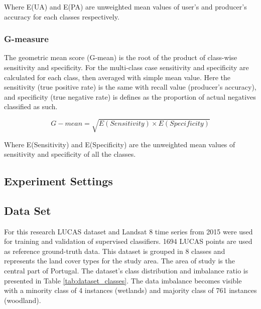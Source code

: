 \documentclass[parskip=full]{scrartcl}
\begin{document}
Where E(UA) and E(PA) are unweighted mean values of user's and producer's
accuracy for each classes respectively.

\subsubsection{G-measure}

The geometric mean score (G-mean) is the root of the product of class-wise
sensitivity and specificity. For the multi-class case sensitivity and
specificity are calculated for each class, then averaged with simple mean
value. Here the sensitivity (true positive rate) is the same with recall
value (producer's accuracy), and specificity (true negative rate) is defines as
the proportion of actual negatives classified as such.

\[
G{-}mean = \sqrt{E(Sensitivity) \times E(Specificity)}
\]

Where E(Sensitivity) and E(Specificity) are the unweighted mean values of
sensitivity and specificity of all the classes.

\subsection{Experiment Settings}

\subsection{Data Set}

For this research LUCAS dataset and Landsat 8 time series from 2015 were used
for training and validation of supervised classifiers. 1694 LUCAS points are
used as reference ground-truth data. This dataset is grouped in 8 classes and
represents the land cover types for the study area. The area of study is the
central part of Portugal. The dataset's class distribution and imbalance ratio
is presented in Table \ref{tab:dataset_classes}. The data imbalance becomes
visible with a minority class of 4 instances (wetlands) and majority class of
761 instances (woodland).
\end{document}
